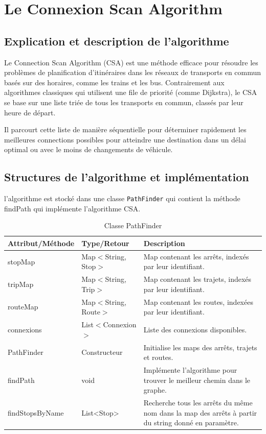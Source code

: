 \documentclass[12pt]{article}
\begin{document}
\section{Le Connexion Scan Algorithm}
\subsection{Explication et description de l'algorithme}
Le Connection Scan Algorithm (CSA) est une méthode efficace pour résoudre les problèmes de planification d'itinéraires dans 
les réseaux de transports en commun basés sur des horaires, comme les trains et les bus. Contrairement aux algorithmes classiques 
qui utilisent une file de priorité (comme Dijkstra), le CSA se base sur une liste triée de tous les transports en commun, classés par 
leur heure de départ.

Il parcourt cette liste de manière séquentielle pour déterminer rapidement les meilleures connections possibles pour atteindre une 
destination dans un délai optimal ou avec le moins de changements de véhicule.

\subsection{Structures de l'algorithme et implémentation}
l'algorithme est stocké dans une classe \texttt{PathFinder} qui contient la méthode findPath qui implémente l'algorithme CSA.
\begin{table}[h]
  \centering
  \begin{tabular}{|l|l|p{8cm}|}
  \hline
  \textbf{Attribut/Méthode} & \textbf{Type/Retour} & \textbf{Description} \\
  \hline
  stopMap & Map$<$String, Stop$>$ & Map contenant les arrêts, indexés par leur identifiant. \\
  tripMap & Map$<$String, Trip$>$ & Map contenant les trajets, indexés par leur identifiant. \\
  routeMap & Map$<$String, Route$>$ & Map contenant les routes, indexées par leur identifiant. \\
  connexions & List$<$Connexion$>$ & Liste des connexions disponibles. \\
  \hline
  PathFinder & Constructeur & Initialise les maps des arrêts, trajets et routes. \\
  findPath & void & Implémente l'algorithme pour trouver le meilleur chemin dans le graphe. \\
  findStopsByName & List<Stop> & Recherche tous les arrêts du même nom dans la map des arrêts à partir du string donné en paramètre. \\
  \hline
  \end{tabular}
  \caption{Classe PathFinder}
\end{table}
\end{document}
